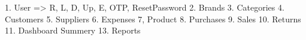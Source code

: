 1. User => R, L, D, Up, E, OTP, ResetPassword
2. Brands 
3. Categories
4. Customers
5. Suppliers
6. Expenses
7, Product
8. Purchases
9. Sales
10. Returns
11. Dashboard Summery
13. Reports